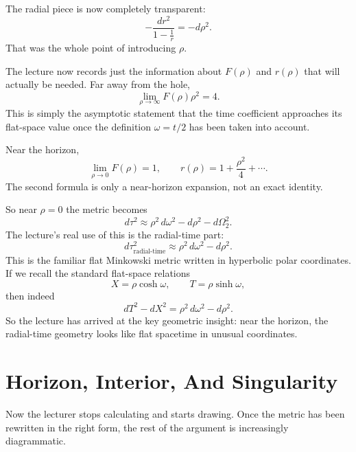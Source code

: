 The radial piece is now completely transparent:
\begin{equation}
-\frac{dr^2}{1-\frac1r}=-d\rho^2.
\end{equation}
That was the whole point of introducing \(\rho\).

The lecture now records just the information about \(F(\rho)\) and \(r(\rho)\) that will actually be needed. Far away from the hole,
\begin{equation}
\lim_{\rho\to\infty}F(\rho)\rho^2=4.
\end{equation}
This is simply the asymptotic statement that the time coefficient approaches its flat-space value once the definition \(\omega=t/2\) has been taken into account.

Near the horizon,
\begin{equation}
\lim_{\rho\to 0}F(\rho)=1,
\qquad
r(\rho)=1+\frac{\rho^2}{4}+\cdots.
\end{equation}
The second formula is only a near-horizon expansion, not an exact identity.

So near \(\rho=0\) the metric becomes
\begin{equation}
d\tau^2
\approx
\rho^2\,d\omega^2
-
d\rho^2
-
d\Omega_2^2.
\end{equation}
The lecture's real use of this is the radial-time part:
\begin{equation}
d\tau^2_{\text{radial-time}}
\approx
\rho^2\,d\omega^2-d\rho^2.
\end{equation}
This is the familiar flat Minkowski metric written in hyperbolic polar coordinates. If we recall the standard flat-space relations
\begin{equation}
X=\rho\cosh\omega,
\qquad
T=\rho\sinh\omega,
\end{equation}
then indeed
\begin{equation}
dT^2-dX^2=\rho^2\,d\omega^2-d\rho^2.
\end{equation}
So the lecture has arrived at the key geometric insight: near the horizon, the radial-time geometry looks like flat spacetime in unusual coordinates.

\section{Horizon, Interior, And Singularity}

Now the lecturer stops calculating and starts drawing. Once the metric has been rewritten in the right form, the rest of the argument is increasingly diagrammatic.

